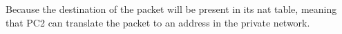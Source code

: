 Because the destination of the packet will be present in its nat table, meaning that PC2 can translate the packet to an address in the private network.
